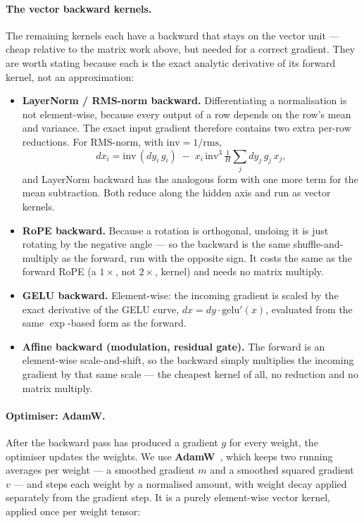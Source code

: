 \documentclass[11pt]{report}
\begin{document}
\paragraph{The vector backward kernels.} The remaining kernels each have a
backward that stays on the vector unit --- cheap relative to the matrix
work above, but needed for a correct gradient. They are worth stating
because each is the exact analytic derivative of its forward kernel, not an
approximation:

\begin{itemize}
\item \textbf{LayerNorm / RMS-norm backward.} Differentiating a
normalisation is not element-wise, because every output of a row depends on
the row's mean and variance. The exact input gradient therefore contains
two extra per-row reductions. For RMS-norm, with $\mathrm{inv}=1/\mathrm{rms}$,
\[
dx_i = \mathrm{inv}\,(dy_i\,g_i) \;-\; x_i\,\mathrm{inv}^3\,\tfrac{1}{H}\textstyle\sum_j dy_j\,g_j\,x_j,
\]
and LayerNorm backward has the analogous form with one more term for the
mean subtraction. Both reduce along the hidden axis and run as vector
kernels.
\item \textbf{RoPE backward.} Because a rotation is orthogonal, undoing it
is just rotating by the negative angle --- so the backward is the same
shuffle-and-multiply as the forward, run with the opposite sign. It costs
the same as the forward RoPE (a $1\times$, not $2\times$, kernel) and needs
no matrix multiply.
\item \textbf{GELU backward.} Element-wise: the incoming gradient is scaled
by the exact derivative of the GELU curve, $dx = dy\cdot\mathrm{gelu}'(x)$,
evaluated from the same $\exp$-based form as the forward.
\item \textbf{Affine backward (modulation, residual gate).} The forward is
an element-wise scale-and-shift, so the backward simply multiplies the
incoming gradient by that same scale --- the cheapest kernel of all, no
reduction and no matrix multiply.
\end{itemize}

\paragraph{Optimiser: AdamW.} After the backward pass has produced a
gradient $g$ for every weight, the optimiser updates the weights. We use
\textbf{AdamW}~\cite{loshchilov2019adamw}, which keeps two running averages
per weight --- a smoothed gradient $m$ and a smoothed squared gradient $v$
--- and steps each weight by a normalised amount, with weight decay applied
separately from the gradient step. It is a purely element-wise vector kernel, applied
once per weight tensor:
\end{document}

